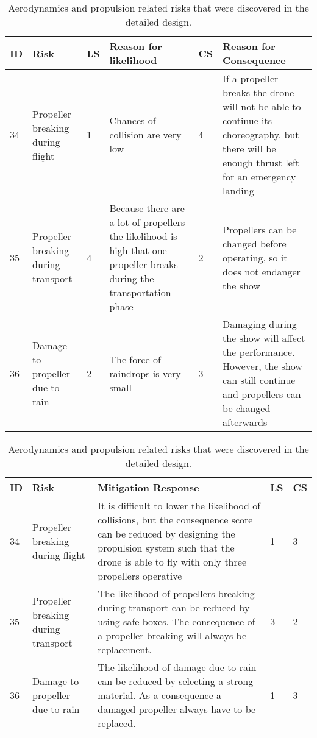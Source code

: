 \begin{table}[H]
\centering
\caption{Aerodynamics and propulsion related risks that were discovered in the detailed design.}
\label{tab:newriskspropulsion}
\begin{scriptsize}
\begin{tabular}{|p{0.4cm}|p{3cm}|p{0.4cm}|p{4.5cm}|p{0.4cm}|p{4.5cm}|}
\hline
\textbf{ID} & \textbf{Risk} & \textbf{LS} & \textbf{Reason for likelihood} & \textbf{CS} & \textbf{Reason for Consequence} \\ 
\hline
34 & Propeller breaking during flight & 1 & Chances of collision are very low & 4 & If a propeller breaks the drone will not be able to continue its choreography, but there will be enough thrust left for an emergency landing \\ \hline
35 & Propeller breaking during transport & 4 & Because there are a lot of propellers the likelihood is high that one propeller breaks during the transportation phase & 2 & Propellers can be changed before operating, so it does not endanger the show \\ \hline
36 & Damage to propeller due to rain & 2 & The force of raindrops is very small & 3 & Damaging during the show will affect the performance. However, the show can still continue and propellers can be changed afterwards \\ \hline
\end{tabular}
\end{scriptsize}
\end{table}

\begin{table}[H]
\centering
\caption{Aerodynamics and propulsion related risks that were discovered in the detailed design.}
\label{tab:newriskspropulsionmitigation}
\begin{scriptsize}
\begin{tabular}{|p{0.4cm}|p{3cm}|p{9.2cm}|p{0.4cm}|p{0.4cm}|} 
\hline
\textbf{ID} & \textbf{Risk} & \textbf{Mitigation Response} & \textbf{LS} & \textbf{CS} \\ \hline
34 & Propeller breaking during flight & It is difficult to lower the likelihood of collisions, but the consequence score can be reduced by designing the propulsion system such that the drone is able to fly with only three propellers operative & 1 & 3 \\ \hline
35 & Propeller breaking during transport & The likelihood of propellers breaking during transport can be reduced by using safe boxes. The consequence of a propeller breaking will always be replacement. & 3 & 2 \\ \hline
36 & Damage to propeller due to rain & The likelihood of damage due to rain can be reduced by selecting a strong material. As a consequence a damaged propeller always have to be replaced. & 1 & 3 \\ \hline
\end{tabular}
\end{scriptsize}
\end{table}

